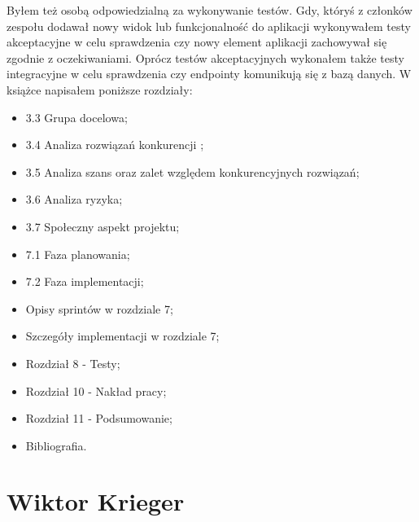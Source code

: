 Byłem też osobą odpowiedzialną za wykonywanie testów. Gdy, któryś z członków zespołu dodawał nowy widok lub funkcjonalność do aplikacji wykonywałem testy akceptacyjne w celu sprawdzenia czy nowy element aplikacji zachowywał się zgodnie z oczekiwaniami. Oprócz testów akceptacyjnych wykonałem także testy integracyjne w celu sprawdzenia czy endpointy komunikują się z bazą danych. W książce napisałem poniższe rozdziały:


\begin{itemize}
    \item 3.3 Grupa docelowa;
    \item 3.4 Analiza rozwiązań konkurencji ;
    \item 3.5 Analiza szans oraz zalet względem konkurencyjnych rozwiązań;
    \item 3.6 Analiza ryzyka;
    \item 3.7 Społeczny aspekt projektu;
    \item 7.1 Faza planowania;
    \item 7.2 Faza implementacji;
    \item Opisy sprintów w rozdziale 7;
    \item Szczegóły implementacji w rozdziale 7;
    \item Rozdział 8 - Testy;
    \item Rozdział 10 - Nakład pracy;
    \item Rozdział 11 - Podsumowanie;
    \item Bibliografia.
\end{itemize}

\section{Wiktor Krieger}


